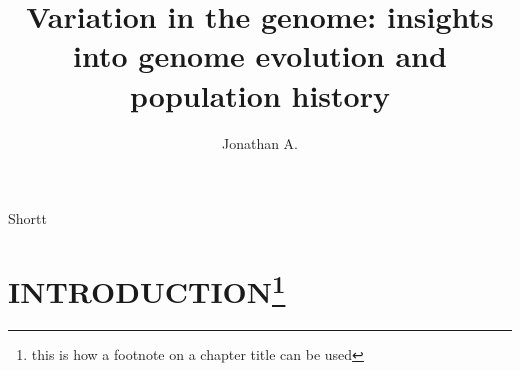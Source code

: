 \documentclass[11pt,letterpaper,]{thesis2}
\begin{document}
\pagestyle{empty}

\title{Variation in the genome: insights into genome evolution and population history} %
%  
\author{Jonathan A.}{Shortt}	%
\titlepage

\pagestyle{fancy}

\chair{} %
\advisor{}{} %
\readerone{}	%
\readertwo{}
\readerthree{}
\approvalpage

\abstractpage{}		%
\clearpage
\vspace*{\fill}
\begin{center}
	\begin{minipage}{.85\textwidth}
		
	\end{minipage}
\end{center}
\vfill %
\newpage

\clearpage %

\newpage

\tableofcontents
\listoftables
\listoffigures

\setcounter{page}{0}

\chapter[INTRODUCTION]{INTRODUCTION\footnote{this is how a footnote on a chapter title can be used} }\label{ch1}

\clearpage
\end{document}
